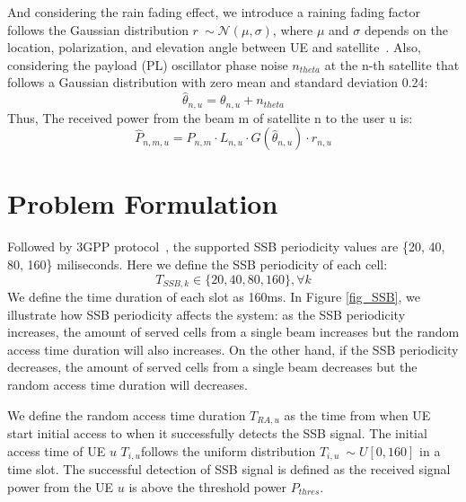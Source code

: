 And considering the rain fading effect, we introduce a raining fading factor follows the Gaussian distribution $r~\sim \mathcal{N}(\mu, \sigma)$, where $\mu$ and $\sigma$
depends on the location, polarization, and elevation angle between UE and satellite~\cite{User-Scheduling}. 
Also, considering the payload (PL) oscillator phase noise $n_{theta}$ at the n-th satellite that follows a Gaussian 
distribution with zero mean and standard deviation 0.24:
\begin{equation}
    \hat\theta_{n,u} = \theta_{n,u} + n_{theta}
\end{equation}
Thus, The received power from the beam m of satellite n to the user u is:
\begin{equation}
    \hat{P}_{n,m,u} = P_{n,m} \cdot L_{n,u} \cdot G(\hat\theta_{n,u}) \cdot r_{n,u}
\end{equation}

\section{Problem Formulation}
Followed by 3GPP protocol~\cite{38331}, the supported SSB periodicity values are 
\{20, 40, 80, 160\} miliseconds. Here we define the SSB periodicity of each cell:
\begin{equation}
    T_{SSB, k}\in\{20, 40, 80, 160\}, \forall k
\end{equation}
We define the time duration of each slot as 160ms. In Figure \ref{fig_SSB}, we illustrate how SSB 
periodicity affects the system: as the SSB periodicity increases, the amount of served cells from a single 
beam increases but the random access time duration will also increases. On the other hand, if the SSB 
periodicity decreases, the amount of served cells from a single beam decreases but the random access time 
duration will decreases.


We define the random access time duration $T_{RA,u}$ as the time from when UE start initial 
access to when it successfully detects the SSB signal. The initial access time of UE $u$ $T_{i,u}$follows 
the uniform distribution $T_{i,u}~\sim U[0, 160]$ in a time slot. The successful detection of SSB signal is 
defined as the received signal power from the UE $u$ is above the threshold power $P_{thres}$.


